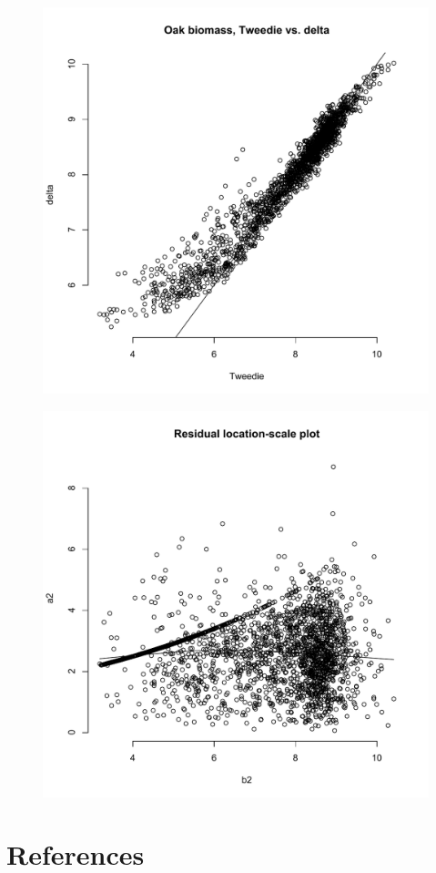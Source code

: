 \documentclass[authoryear, review, 11pt]{elsarticle}
\begin{document}
\begin{figure}
	\begin{center}
	\includegraphics[width=5in]{../../figures/Exploration/Oak-biomass-tweedie2-v-delta.pdf}
	\caption{\label{fig:oaks-biomass-spline}}
	\end{center}
\end{figure}

\begin{figure}
	\begin{center}
	\includegraphics[width=5in]{../../figures/Exploration/Oak-Tweedie2-location-scale.pdf}
	\caption{\label{fig:oaks-tweedie2-location-scale}}
	\end{center}
\end{figure}


\section{References}
%
%
\end{document}
